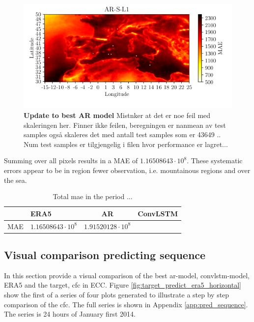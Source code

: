 \begin{figure}
    \centering
    \includegraphics{python_figs/mea_best_ar_model_tcc_L1_in_folder_AR-S-L1.png}
    \caption{\textbf{Update to best AR model} Mistnker at det er noe feil med skaleringen her. Finner ikke feilen, beregningen er nanmean av test samples også skaleres det med antall test samples som er 43649 .. Num test samples er tilgjengelig i filen hvor performance er lagret...}
    \label{fig:MAE_AR}
\end{figure}

Summing over all pixels results in a MAE of $1.16508643\cdot10^8$. These systematic errors appear to be in region fewer observation, i.e. mountainous regions and over the sea. %
\begin{table}[]
    \centering
    \begin{tabular}{llll}
    \multicolumn{1}{c}{\textbf{}} & \textbf{ERA5} & \multicolumn{1}{c}{\textbf{AR}} & \multicolumn{1}{c}{\textbf{ConvLSTM}} \\ \hline
    MAE & $1.16508643\cdot10^8$  & $1.91520128 \cdot 10^8$ & 
    \end{tabular}
    \caption{Total \acrfull{mae} in the period ...}
    \label{tab:tot_mae_score}
\end{table}


\subsection{Visual comparison predicting sequence}
In this section provide a visual comparison of the best \acrshort{ar}-model, \acrshort{convlstm}-model, ERA5 and the target, \acrshort{cfc} in \acrshort{ECC}. Figure \ref{fig:target_predict_era5_horizontal} show the first of a series of four plots generated to illustrate a step by step comparison of the \acrshort{cfc}. The full series is shown in Appendix \ref{app:pred_sequence}. The series is 24 hours of January first 2014.

